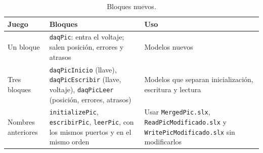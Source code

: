 \documentclass[11pt]{article}
\newcommand{\code}[1]{\texttt{#1}}
\begin{document}
\begin{table}[H]
\centering
\small
\begin{tabularx}{\linewidth}{@{}lYY@{}}
\toprule
Juego & Bloques & Uso \\
\midrule
Un bloque & \code{daqPic}: entra el voltaje; salen posición, errores y
  atrasos & Modelos nuevos \\
\addlinespace
Tres bloques & \code{daqPicInicio} (llave), \code{daqPicEscribir} (llave,
  voltaje), \code{daqPicLeer} (posición, errores, atrasos) & Modelos que
  separan inicialización, escritura y lectura \\
\addlinespace
Nombres anteriores & \code{initializePic}, \code{escribirPic},
  \code{leerPic}, con los mismos puertos y en el mismo orden & Usar
  \code{MergedPic.slx}, \code{ReadPicModificado.slx} y
  \code{WritePicModificado.slx} sin modificarlos \\
\bottomrule
\end{tabularx}
\caption{Bloques nuevos.}
\label{tab:bloques}
\end{table}
\end{document}
